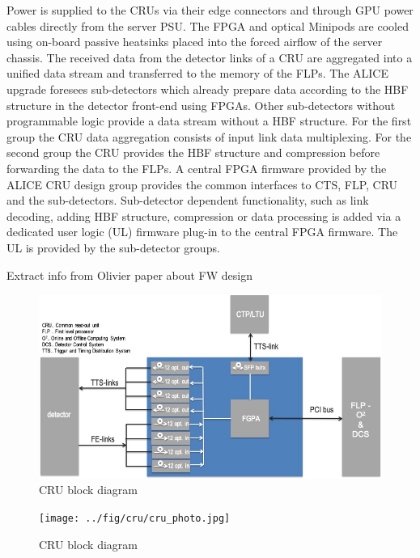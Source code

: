 Power is supplied to the CRUs via their edge connectors and through GPU power cables directly from the server PSU. The FPGA and optical Minipods are cooled using on-board passive heatsinks placed into the forced airflow of the server chassis.   
The received data from the detector links of a CRU are aggregated into a unified data stream and transferred to the memory of the FLPs. The ALICE upgrade foresees sub-detectors  which already prepare data according to the HBF structure in the detector front-end using FPGAs. Other sub-detectors without programmable logic provide a data stream without a HBF structure. For the first group the CRU data aggregation consists of input link data multiplexing. For the second group the CRU provides the HBF structure and compression before forwarding the data to the FLPs. A central FPGA firmware provided by the ALICE CRU design group provides the common interfaces to CTS, FLP, CRU and the sub-detectors. Sub-detector dependent functionality, such as link decoding, adding HBF structure, compression or data processing is added via a dedicated user logic (UL) firmware plug-in to the central FPGA firmware. The UL is provided by the sub-detector groups.

Extract info from Olivier paper about FW design


\begin{figure}[hbtp]
  \begin{center}
    \includegraphics[width=1.\textwidth]{../fig/cru/cru_block.jpg}
  \end{center}
  \caption{CRU block diagram}
  \label{fig_ro:cru_block}
\end{figure}

\begin{figure}[hbtp]
  \begin{center}
    \texttt{[image: ../fig/cru/cru\_photo.jpg]}
  \end{center}
  \caption{CRU block diagram}
  \label{fig_ro:cru_photo}
\end{figure}

